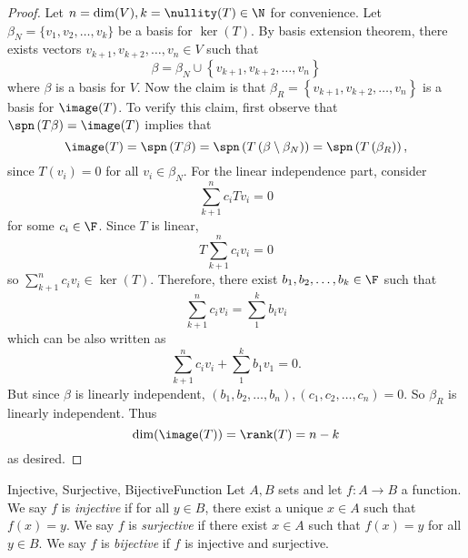 \documentclass[linearalgebra]{subfiles}
\begin{document}
    \begin{proof}
        Let $n=\dim(V), k=\nullity(T)\in\N$ for convenience. Let $\beta_N = \lbrace v_1, v_2, \ldots, v_k \rbrace$ be a basis for $\ker(T)$. By basis extension theorem, there exists vectors $v_{k+1}, v_{k+2}, \ldots, v_n\in V$ such that
        \begin{equation*}
            \beta = \beta_N \cup \left\lbrace v_{k+1}, v_{k+2}, \ldots, v_n \right\rbrace 
        \end{equation*}
        where $\beta$ is a basis for $V$. Now the claim is that $\beta_R = \left\lbrace v_{k+1}, v_{k+2}, \ldots, v_n \right\rbrace $ is a basis for $\image(T)$. To verify this claim, first observe that $\spn\left( T\beta \right)  = \image(T)$ implies that
        \begin{equation*}
            \image(T) = \spn\left( T\beta \right) = \spn\left( T\left( \beta\setminus\beta_N \right)  \right) = \spn\left( T\left( \beta_R \right)  \right) ,
        \end{equation*}
        since $T(v_i) = 0$ for all $v_i\in \beta_N$. For the linear independence part, consider
        \begin{equation*}
            \sum^n_{k+1} c_iTv_i = 0
        \end{equation*}
        for some $c_i\in \F$. Since $T$ is linear,
        \begin{equation*}
            T\sum^n_{k+1} c_iv_i = 0
        \end{equation*}
        so $\sum^n_{k+1} c_iv_i\in \ker(T)$. Therefore, there exist $b_1, b_2, \ldots, b_k\in \F$ such that
        \begin{equation*}
            \sum^n_{k+1} c_iv_i = \sum^k_1 b_iv_i
        \end{equation*}
        which can be also written as
        \begin{equation*}
            \sum^n_{k+1} c_iv_i + \sum^k_1 b_1v_1 = 0.
        \end{equation*}
        But since $\beta$ is linearly independent, $(b_1, b_2, \ldots, b_n), (c_1, c_2, \ldots, c_n) = 0$. So $\beta_R$ is linearly independent. Thus
        \begin{equation*}
            \dim (\image(T)) = \rank(T) = n-k
        \end{equation*}
        as desired.
    \end{proof}

    \begin{recall}{Injective, Surjective, Bijective}{Function}
        Let $A, B$ sets and let $f:A\to B$ a function. We say $f$ is \emph{injective} if for all $y\in B$, there exist a unique $x\in A$ such that $f(x)=y$. We say $f$ is \emph{surjective} if there exist $x\in A$ such that $f(x)=y$ for all $y\in B$. We say $f$ is \emph{bijective} if $f$ is injective and surjective.
    \end{recall}
\end{document}
